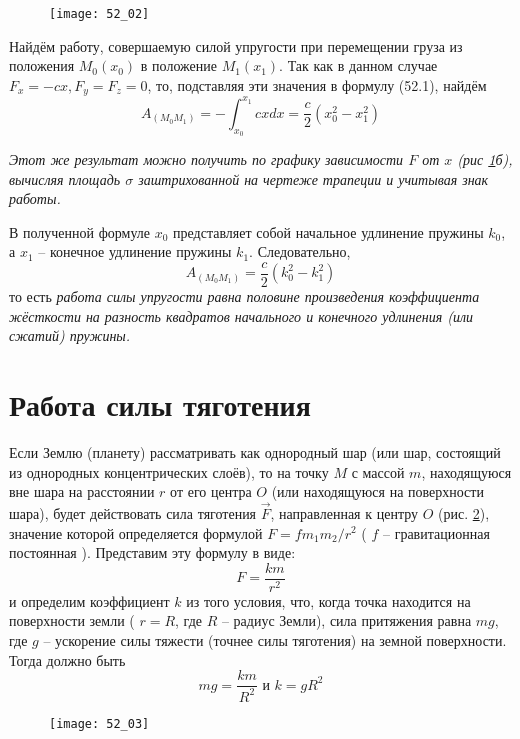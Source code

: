 \begin{figure}[h!]
    \texttt{[image: 52\_02]}
    \parbox{.47\textwidth}{\caption{} \label{pic52_02}}
\end{figure}

Найдём работу, совершаемую силой упругости при перемещении груза из 
положения \( M_0(x_0) \) в положение \( M_1(x_1) \). Так как в данном 
случае \( F_x = -cx, F_y = F_z = 0 \), то, подставляя эти значения в 
формулу (52.1), найдём
\[ 
    A_{(M_0 M_1)} = - \int_{x_0}^{x_1} cxdx = 
    \frac{c}{2} \left( x^{2}_0 - x^{2}_1 \right) 
\]

\emph{Этот же результат можно получить по графику зависимости 
\( F \) от \( x \) (рис \ref{pic52_02}б), вычисляя площадь \( \sigma \) 
заштрихованной на чертеже трапеции и учитывая знак работы.}

В полученной формуле \( x_0 \) представляет собой начальное удлинение 
пружины \( k_0 \), а \( x_1 \) -- конечное удлинение пружины \( k_1 \). 
Следовательно, 
\[ A_{(M_0 M_1)} = \frac{c}{2} \left( k^{2}_0 - k^{2}_1 \right) \]
то есть \emph{работа силы упругости равна половине произведения 
коэффициента жёсткости на разность квадратов начального и конечного 
удлинения (или сжатий) пружины.}

\section{Работа силы тяготения}
Если Землю (планету) рассматривать как однородный шар (или шар, 
состоящий из однородных концентрических слоёв), то на точку \( M \) с 
массой \( m \), находящуюся вне шара на расстоянии \( r \) от его 
центра \( O \) (или находящуюся на поверхности шара), будет действовать 
сила тяготения \( \vec{F} \), направленная к центру \( O \) (рис. \ref{pic52_03}), 
значение которой определяется формулой \( F = fm_1 m_2 / r^2 \) 
( \( f \) -- гравитационная постоянная ). Представим эту формулу в виде: 
\[ F = \frac{km}{r^2} \]
и определим коэффициент \( k \) из того условия, что, когда точка 
находится на поверхности земли ( \( r = R \), где \( R \) -- радиус Земли), 
сила притяжения равна \( mg \), где \( g \) -- ускорение силы тяжести 
(точнее силы тяготения) на земной поверхности. Тогда должно быть
\[ mg = \frac{km}{R^2} \text{ и } k = gR^2 \]

\begin{figure}[h!]
    \texttt{[image: 52\_03]}
    \parbox{.47\textwidth}{\caption{} \label{pic52_03}}
\end{figure}

